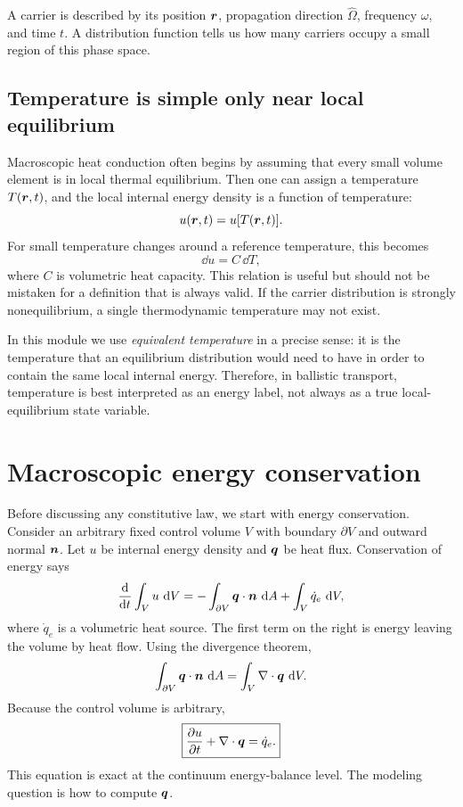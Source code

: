 \documentclass[11pt]{article}
\begin{document}
A carrier is described by its position \(\bm{r}\), propagation direction \(\hat{\Omega}\), frequency \(\omega\), and time \(t\). A distribution function tells us how many carriers occupy a small region of this phase space.

\subsection{Temperature is simple only near local equilibrium}
Macroscopic heat conduction often begins by assuming that every small volume element is in local thermal equilibrium. Then one can assign a temperature \(T(\bm{r},t)\), and the local internal energy density is a function of temperature:
\begin{equation}
    u(\bm{r},t)=u[T(\bm{r},t)].
\end{equation}
For small temperature changes around a reference temperature, this becomes
\begin{equation}
    \dd u = C\,\dd T,
\end{equation}
where \(C\) is volumetric heat capacity. This relation is useful but should not be mistaken for a definition that is always valid. If the carrier distribution is strongly nonequilibrium, a single thermodynamic temperature may not exist.

In this module we use \emph{equivalent temperature} in a precise sense: it is the temperature that an equilibrium distribution would need to have in order to contain the same local internal energy. Therefore, in ballistic transport, temperature is best interpreted as an energy label, not always as a true local-equilibrium state variable.

\section{Macroscopic energy conservation}
Before discussing any constitutive law, we start with energy conservation. Consider an arbitrary fixed control volume \(V\) with boundary \(\partial V\) and outward normal \(\bm{n}\). Let \(u\) be internal energy density and \(\bm{q}\) be heat flux. Conservation of energy says
\begin{equation}
    \frac{\mathop{}\!\mathrm{d}}{\mathop{}\!\mathrm{d} t}\int_V u\,\mathop{}\!\mathrm{d} V
    =-\int_{\partial V}\bm{q}\cdot\bm{n}\,\mathop{}\!\mathrm{d} A
    +\int_V \dot{q}_e\,\mathop{}\!\mathrm{d} V,
\end{equation}
where \(\dot{q}_e\) is a volumetric heat source. The first term on the right is energy leaving the volume by heat flow. Using the divergence theorem,
\begin{equation}
    \int_{\partial V}\bm{q}\cdot\bm{n}\,\mathop{}\!\mathrm{d} A
    =\int_V \nabla\cdot\bm{q}\,\mathop{}\!\mathrm{d} V.
\end{equation}
Because the control volume is arbitrary,
\begin{equation}
    \boxed{\frac{\partial u}{\partial t}+\nabla\cdot\bm{q}=\dot{q}_e.}
    \label{eq:local_energy_conservation}
\end{equation}
This equation is exact at the continuum energy-balance level. The modeling question is how to compute \(\bm{q}\).
\end{document}
